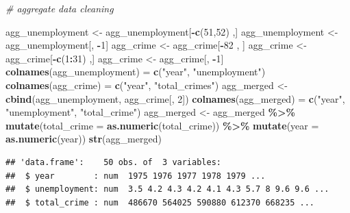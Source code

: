\documentclass[
]{article}
\newenvironment{Shaded}{\begin{snugshade}}{\end{snugshade}}
\newcommand{\AttributeTok}[1]{\textcolor[rgb]{0.13,0.29,0.53}{#1}}
\newcommand{\CommentTok}[1]{\textcolor[rgb]{0.56,0.35,0.01}{\textit{#1}}}
\newcommand{\DecValTok}[1]{\textcolor[rgb]{0.00,0.00,0.81}{#1}}
\newcommand{\FunctionTok}[1]{\textcolor[rgb]{0.13,0.29,0.53}{\textbf{#1}}}
\newcommand{\NormalTok}[1]{#1}
\newcommand{\OtherTok}[1]{\textcolor[rgb]{0.56,0.35,0.01}{#1}}
\newcommand{\SpecialCharTok}[1]{\textcolor[rgb]{0.81,0.36,0.00}{\textbf{#1}}}
\newcommand{\StringTok}[1]{\textcolor[rgb]{0.31,0.60,0.02}{#1}}
\begin{document}
\begin{Shaded}
\begin{Highlighting}[]
\CommentTok{\# aggregate data cleaning}

\NormalTok{agg\_unemployment }\OtherTok{\textless{}{-}}\NormalTok{ agg\_unemployment[}\SpecialCharTok{{-}}\FunctionTok{c}\NormalTok{(}\DecValTok{51}\NormalTok{,}\DecValTok{52}\NormalTok{) ,]}
\NormalTok{agg\_unemployment }\OtherTok{\textless{}{-}}\NormalTok{ agg\_unemployment[, }\SpecialCharTok{{-}}\DecValTok{1}\NormalTok{]}
\NormalTok{agg\_crime }\OtherTok{\textless{}{-}}\NormalTok{ agg\_crime[}\SpecialCharTok{{-}}\DecValTok{82}\NormalTok{ , ]}
\NormalTok{agg\_crime }\OtherTok{\textless{}{-}}\NormalTok{ agg\_crime[}\SpecialCharTok{{-}}\FunctionTok{c}\NormalTok{(}\DecValTok{1}\SpecialCharTok{:}\DecValTok{31}\NormalTok{) ,]}
\NormalTok{agg\_crime }\OtherTok{\textless{}{-}}\NormalTok{ agg\_crime[, }\SpecialCharTok{{-}}\DecValTok{1}\NormalTok{]}
\FunctionTok{colnames}\NormalTok{(agg\_unemployment) }\OtherTok{=} \FunctionTok{c}\NormalTok{(}\StringTok{"year"}\NormalTok{, }\StringTok{"unemployment"}\NormalTok{)}
\FunctionTok{colnames}\NormalTok{(agg\_crime) }\OtherTok{=} \FunctionTok{c}\NormalTok{(}\StringTok{"year"}\NormalTok{, }\StringTok{"total\_crimes"}\NormalTok{)}
\NormalTok{agg\_merged }\OtherTok{\textless{}{-}} \FunctionTok{cbind}\NormalTok{(agg\_unemployment, agg\_crime[, }\DecValTok{2}\NormalTok{])}
\FunctionTok{colnames}\NormalTok{(agg\_merged) }\OtherTok{=} \FunctionTok{c}\NormalTok{(}\StringTok{"year"}\NormalTok{, }\StringTok{"unemployment"}\NormalTok{, }\StringTok{"total\_crime"}\NormalTok{)}
\NormalTok{agg\_merged }\OtherTok{\textless{}{-}}\NormalTok{ agg\_merged }\SpecialCharTok{\%\textgreater{}\%}
  \FunctionTok{mutate}\NormalTok{(}\AttributeTok{total\_crime =} \FunctionTok{as.numeric}\NormalTok{(total\_crime)) }\SpecialCharTok{\%\textgreater{}\%}
  \FunctionTok{mutate}\NormalTok{(}\AttributeTok{year =} \FunctionTok{as.numeric}\NormalTok{(year))}
\FunctionTok{str}\NormalTok{(agg\_merged)}
\end{Highlighting}
\end{Shaded}

\begin{verbatim}
## 'data.frame':    50 obs. of  3 variables:
##  $ year        : num  1975 1976 1977 1978 1979 ...
##  $ unemployment: num  3.5 4.2 4.3 4.2 4.1 4.3 5.7 8 9.6 9.6 ...
##  $ total_crime : num  486670 564025 590880 612370 668235 ...
\end{verbatim}
\end{document}
